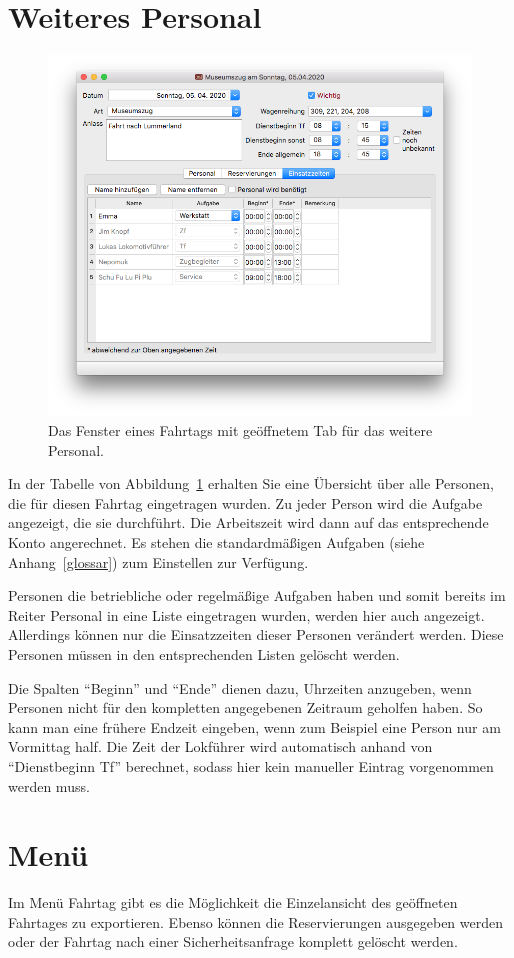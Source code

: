 \section{Weiteres Personal}
\begin{figure}[!h]
	\includegraphics[width=\textwidth]{img/fahrtag_einsatzzeiten}
	\caption{Das Fenster eines Fahrtags mit geöffnetem Tab für das weitere Personal.}
	\label{fig:fahrtag:einsatzzeiten}
\end{figure}

In der Tabelle von Abbildung~\ref{fig:fahrtag:einsatzzeiten} erhalten Sie eine Übersicht über alle Personen,
die für diesen Fahrtag eingetragen wurden.
Zu jeder Person wird die Aufgabe angezeigt, die sie durchführt.
Die Arbeitszeit wird dann auf das entsprechende Konto angerechnet.
Es stehen die standardmäßigen Aufgaben (siehe Anhang~\ref{glossar}) zum Einstellen zur Verfügung.

Personen die betriebliche oder regelmäßige Aufgaben haben und somit bereits im Reiter Personal in eine Liste eingetragen wurden, werden hier auch angezeigt.
Allerdings können nur die Einsatzzeiten dieser Personen verändert werden.
Diese Personen müssen in den entsprechenden Listen gelöscht werden.


Die Spalten "`Beginn"' und "`Ende"' dienen dazu, Uhrzeiten anzugeben, wenn Personen nicht für den kompletten angegebenen Zeitraum geholfen haben.
So kann man eine frühere Endzeit eingeben, wenn zum Beispiel eine Person nur am Vormittag half.
Die Zeit der Lokführer wird automatisch anhand von "`Dienstbeginn Tf"' berechnet,
sodass hier kein manueller Eintrag vorgenommen werden muss.



\section{Menü}
Im Menü Fahrtag gibt es die Möglichkeit die Einzelansicht des geöffneten Fahrtages zu exportieren.
Ebenso können die Reservierungen ausgegeben werden oder der Fahrtag nach einer Sicherheitsanfrage komplett gelöscht werden.
